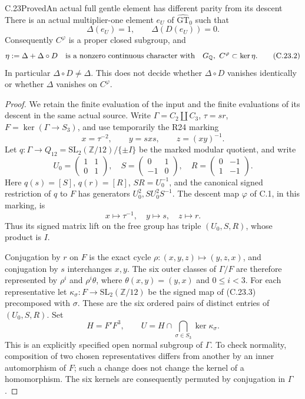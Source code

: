 \begin{statement}{C.23}{Proved}{An actual full gentle element has different parity from its descent}
There is an actual multiplier-one element $e_U$ of
$\widehat{\mathrm{GT}}_0$ such that
\[
             \Delta(e_U)=1,\qquad \Delta(D(e_U))=0.
 \tag{C.23.1}
\]
Consequently $C^\varphi$ is a proper closed subgroup, and
\[
 \eta:=\Delta+\Delta\circ D
 \quad\hbox{is a nonzero continuous character with}\quad
 G_{\mathbb Q},\ C^\varphi\subset\ker\eta.
 \tag{C.23.2}
\]
In particular $\Delta\circ D\ne\Delta$.
This does not decide whether $\Delta\circ D$ vanishes
identically or whether $\Delta$ vanishes on $C^\varphi$.
\end{statement}
\begin{proof}
We retain the finite evaluation of the input and the
finite evaluations of its descent in the same actual
source. Write $\Gamma=C_2\amalg C_3$, $\tau=sr$,
$F=\ker(\Gamma\to S_3)$, and use temporarily the
R24 marking
\[
       x=\tau^{-2},\qquad y=sxs,\qquad z=(xy)^{-1}.
\]
Let $q:\Gamma\to Q_{12}=\mathrm{SL}_2(\mathbb Z/12)/\{\pm I\}$
be the marked modular quotient, and write
\[
 U_0=\begin{pmatrix}1&1\\0&1\end{pmatrix},\quad
 S=\begin{pmatrix}0&1\\-1&0\end{pmatrix},\quad
 R=\begin{pmatrix}0&-1\\1&-1\end{pmatrix}.
\]
Here $q(s)=[S]$, $q(r)=[R]$, $SR=U_0^{-1}$,
and the canonical signed restriction of $q$ to $F$
has generators $U_0^2,SU_0^2S^{-1}$.
The descent map $\varphi$ of C.1, in this marking, is
\[
            x\longmapsto\tau^{-1},\quad
            y\longmapsto s,\quad z\longmapsto r.
 \tag{C.23.3}
\]
Thus its signed matrix lift on the free group has
triple $(U_0,S,R)$, whose product is $I$.

Conjugation by $r$ on $F$ is the exact cycle
$\rho:(x,y,z)\mapsto(y,z,x)$, and conjugation by
$s$ interchanges $x,y$. The six outer classes of
$\Gamma/F$ are therefore represented by
$\rho^i$ and $\rho^i\theta$, where
$\theta(x,y)=(y,x)$ and $0\leq i<3$.
For each representative let $\kappa_\sigma:F\to
\mathrm{SL}_2(\mathbb Z/12)$ be the signed map of
(C.23.3) precomposed with $\sigma$. These are the
six ordered pairs of distinct entries of $(U_0,S,R)$.
Set
\[
 H=F'F^3,\qquad
 U=H\cap\bigcap_{\sigma\in S_3}\ker\kappa_\sigma.
 \tag{C.23.4}
\]
This is an explicitly specified open normal subgroup
of $\Gamma$. To check normality, composition of two
chosen representatives differs from another by an
inner automorphism of $F$; such a change does not
change the kernel of a homomorphism. The six kernels
are consequently permuted by conjugation in $\Gamma$.


\end{proof}
